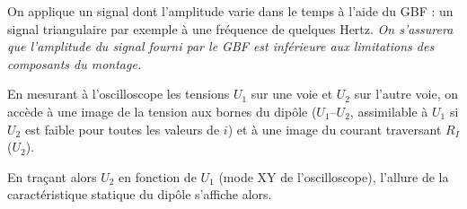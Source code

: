 On applique un signal dont l'amplitude varie dans le temps à l'aide du GBF : un signal triangulaire par exemple à une fréquence de quelques Hertz. \textit{On s'assurera que l'amplitude du signal fourni par le GBF est inférieure aux limitations des composants du montage.}

En mesurant à l'oscilloscope les tensions $U_1$ sur une voie et $U_2$ sur l'autre voie, on accède à une image de la tension aux bornes du dipôle ($U_1 – U_2$, assimilable à $U_1$ si $U_2$ est faible pour toutes les valeurs de $i$) et à une image du courant traversant $R_I$ ($U_2$).

En traçant alors $U_2$ en fonction de $U_1$ (mode XY de l'oscilloscope), l'allure de la caractéristique statique du dipôle s'affiche alors.